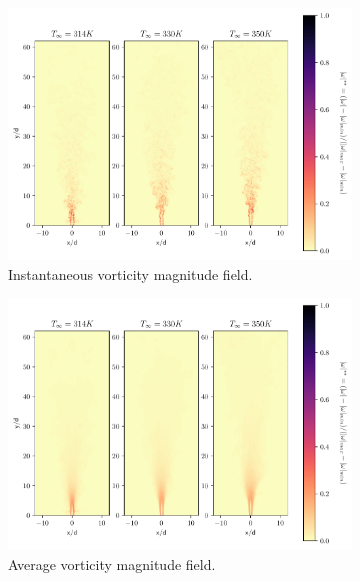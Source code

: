 \begin{figure}[H]
\begin{subfigure}{0.5\textwidth}
	\centering
	\includegraphics[scale=.45]{figures/Plots/vertical/magvort_scaled_vert_all.pdf}
	\caption{Instantaneous vorticity magnitude field.} \label{all_magvort_1}
\end{subfigure}
\hfill
\begin{subfigure}{0.5\textwidth}
	\centering
	\includegraphics[scale=.45]{figures/Plots/vertical/magvort_scaled_vert_avg_all.pdf}
	\caption{Average vorticity magnitude field.} \label{all_magvort_2}
\end{subfigure}
\vfill
\centering
\begin{subfigure}{0.5\textwidth}

\end{subfigure}
\end{figure}
